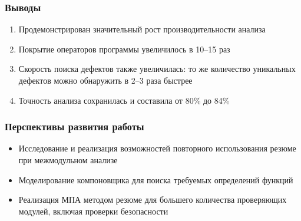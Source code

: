 \documentclass[hyperref={pdfpagelabels=false}]{beamer}
\begin{document}
\begin{frame}[allowframebreaks]
\frametitle{Выводы}
\begin{enumerate}
  \item Продемонстрирован значительный рост производительности анализа
  \item Покрытие операторов программы увеличилось в 10--15 раз
  \item Скорость поиска дефектов также увеличилась: то же количество уникальных дефектов можно обнаружить в 2--3 раза быстрее
  \item Точность анализа сохранилась и составила от 80\% до 84\%
\end{enumerate}
\end{frame}
\begin{frame}
\frametitle{Перспективы развития работы}
\begin{itemize}
  \item Исследование и реализация возможностей повторного использования резюме при межмодульном анализе
  \item Моделирование компоновщика для поиска требуемых определений функций
  \item Реализация МПА методом резюме для большего количества проверяющих модулей, включая проверки безопасности
\end{itemize}
\end{frame}
\end{document}
